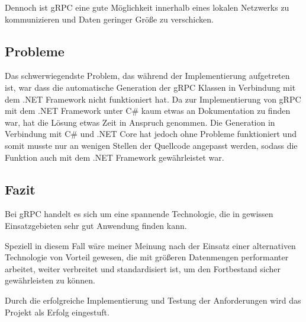 Dennoch ist {\acs{gRPC}} eine gute Möglichkeit innerhalb eines lokalen Netzwerks zu kommunizieren und Daten geringer Größe zu verschicken.

\subsection{Probleme}
\label{sec:Probleme}
Das schwerwiegendste Problem, das während der Implementierung aufgetreten ist, war dass die automatische Generation der {\acs{gRPC}} Klassen in Verbindung mit dem .NET Framework nicht funktioniert hat. Da zur Implementierung von {\acs{gRPC}} mit dem .NET Framework unter C\# kaum etwas an Dokumentation zu finden war, hat die Lösung etwas Zeit in Anspruch genommen. Die Generation in Verbindung mit C\# und .NET Core hat jedoch ohne Probleme funktioniert und somit musste nur an wenigen Stellen der Quellcode angepasst werden, sodass die Funktion auch mit dem .NET Framework gewährleistet war.

\subsection{Fazit}
\label{sec:Fazit}
Bei {\acs{gRPC}} handelt es sich um eine spannende Technologie, die in gewissen Einsatzgebieten sehr gut Anwendung finden kann.

Speziell in diesem Fall wäre meiner Meinung nach der Einsatz einer alternativen Technologie von Vorteil gewesen, die mit größeren Datenmengen performanter arbeitet, weiter verbreitet und standardisiert ist, um den Fortbestand sicher gewährleisten zu können.

Durch die erfolgreiche Implementierung und Testung der Anforderungen wird das Projekt als Erfolg eingestuft.